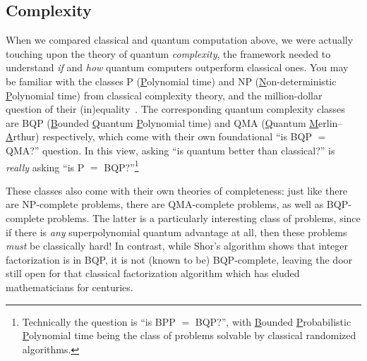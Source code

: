   \subsection{Complexity}\label{sec:complexity}
    When we compared classical and quantum computation above,
      we were actually touching upon the theory of quantum \emph{complexity}, 
      the framework needed to understand \emph{if} and \emph{how} quantum
      computers outperform classical ones. 
      You may be familiar with the classes P
      (\underline{P}olynomial time) and NP (\underline{N}on-deterministic
      \underline{P}olynomial time)
      from classical complexity theory,
      and the million-dollar question of their (in)equality~\cite{Cook00}. The
      corresponding quantum complexity classes are BQP (\underline{B}ounded
      \underline{Q}uantum \underline{P}olynomial time) and QMA
      (\underline{Q}uantum \underline{M}erlin--\underline{A}rthur)
      respectively, which come with their own foundational ``is BQP $=$ QMA?''
      question.
      In this view, asking ``is quantum better than classical?'' is
      \emph{really} asking ``is P $=$ BQP?''\footnote{
        Technically the question is ``is BPP $=$ BQP?'', with \underline{B}ounded
        \underline{P}robabilistic \underline{P}olynomial time being the class of
        problems solvable by classical randomized algorithms.
      }

    These classes also come with their own theories of completeness: just like
      there are NP-complete problems,
      there are QMA-complete problems, as well as BQP-complete problems.
      The latter is a particularly interesting class of problems, since if
      there is \emph{any} superpolynomial quantum advantage at all, then
      these problems \emph{must} be classically hard!
      In contrast, while Shor's algorithm shows that integer factorization is in BQP,
      it is not (known to be) BQP-complete, leaving the door still open for that
      classical factorization algorithm which has eluded mathematicians for
      centuries.

